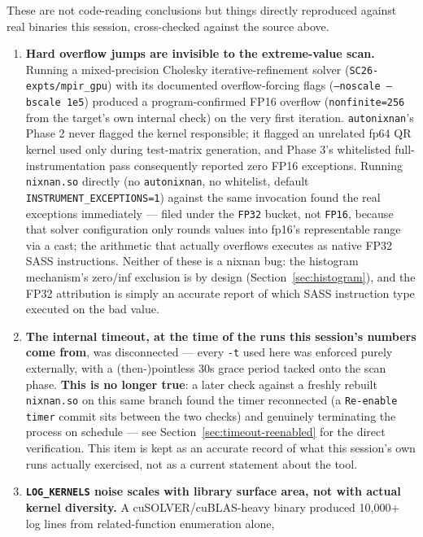 \documentclass[11pt]{article}
\begin{document}
These are not code-reading conclusions but things directly reproduced
against real binaries this session, cross-checked against the source
above.

\begin{enumerate}
\item \textbf{Hard overflow jumps are invisible to the extreme-value
  scan.} Running a mixed-precision Cholesky iterative-refinement solver
  (\texttt{SC26-expts/mpir\_gpu}) with its documented overflow-forcing
  flags (\texttt{--noscale --bscale 1e5}) produced a program-confirmed
  FP16 overflow (\texttt{nonfinite=256} from the target's own internal
  check) on the very first iteration. \texttt{autonixnan}'s Phase 2 never
  flagged the kernel responsible; it flagged an unrelated fp64 QR kernel
  used only during test-matrix generation, and Phase 3's whitelisted
  full-instrumentation pass consequently reported zero FP16 exceptions.
  Running \texttt{nixnan.so} directly (no \texttt{autonixnan}, no
  whitelist, default \texttt{INSTRUMENT\_EXCEPTIONS=1}) against the same
  invocation found the real exceptions immediately --- filed under the
  \texttt{FP32} bucket, not \texttt{FP16}, because that solver
  configuration only rounds values into fp16's representable range via a
  cast; the arithmetic that actually overflows executes as native FP32
  SASS instructions. Neither of these is a nixnan bug: the histogram
  mechanism's zero/inf exclusion is by design (Section~\ref{sec:histogram}),
  and the FP32 attribution is simply an accurate report of which SASS
  instruction type executed on the bad value.
\item \textbf{The internal timeout, at the time of the runs this
  session's numbers come from}, was disconnected --- every \texttt{-t}
  used here was enforced purely externally, with a (then-)pointless 30s
  grace period tacked onto the scan phase. \textbf{This is no longer
  true}: a later check against a freshly rebuilt \texttt{nixnan.so} on
  this same branch found the timer reconnected (a
  \texttt{Re-enable timer} commit sits between the two checks) and
  genuinely terminating the process on schedule --- see
  Section~\ref{sec:timeout-reenabled} for the direct verification. This
  item is kept as an accurate record of what this session's own runs
  actually exercised, not as a current statement about the tool.
\item \textbf{\texttt{LOG\_KERNELS} noise scales with library surface
  area, not with actual kernel diversity.} A cuSOLVER/cuBLAS-heavy binary
  produced 10{,}000+ log lines from related-function enumeration alone,

\end{enumerate}
\end{document}
